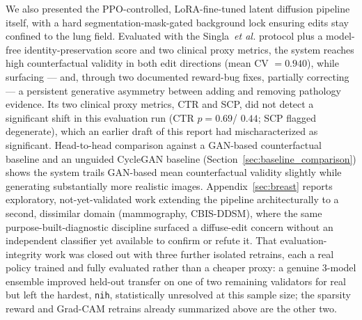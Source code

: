 \documentclass[11pt]{article}
\begin{document}
We also presented the PPO-controlled, LoRA-fine-tuned latent diffusion
pipeline itself, with a hard segmentation-mask-gated background lock
ensuring edits stay confined to the lung field. Evaluated with the
Singla~\emph{et al.} protocol plus a model-free identity-preservation
score and two clinical proxy metrics, the system reaches high
counterfactual validity in both edit directions (mean CV $=0.940$), while
surfacing — and, through two documented reward-bug fixes, partially
correcting — a persistent generative asymmetry between adding and
removing pathology evidence. Its two clinical proxy metrics, CTR and SCP,
did not detect a significant shift in this evaluation run (CTR $p=0.69$/
$0.44$; SCP flagged degenerate), which an earlier draft of this report
had mischaracterized as significant. Head-to-head comparison against a
GAN-based counterfactual baseline and an unguided CycleGAN baseline
(Section~\ref{sec:baseline_comparison}) shows the system trails GAN-based
mean counterfactual validity slightly while generating substantially more
realistic images. Appendix~\ref{sec:breast} reports exploratory,
not-yet-validated work extending the pipeline architecturally to a
second, dissimilar domain (mammography, CBIS-DDSM), where the same
purpose-built-diagnostic discipline surfaced a diffuse-edit concern
without an independent classifier yet available to confirm or refute it.
That evaluation-integrity work was closed out with three further isolated
retrains, each a real policy trained and fully evaluated rather than a
cheaper proxy: a genuine 3-model ensemble improved held-out transfer on
one of two remaining validators for real but left the hardest,
\texttt{nih}, statistically unresolved at this sample size; the sparsity
reward and Grad-CAM retrains already summarized above are the other two.
\end{document}
